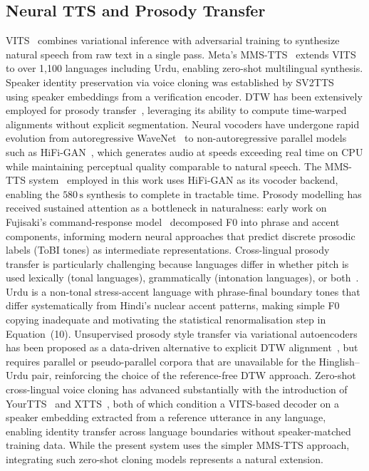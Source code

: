 \documentclass[10pt,twocolumn]{article}
\begin{document}
\subsection{Neural TTS and Prosody Transfer}
VITS~\cite{kim2021conditional} combines variational inference with adversarial training to synthesize natural speech from raw text in a single pass. Meta's MMS-TTS~\cite{pratap2023scaling} extends VITS to over 1,100 languages including Urdu, enabling zero-shot multilingual synthesis. Speaker identity preservation via voice cloning was established by SV2TTS~\cite{jia2018transfer} using speaker embeddings from a verification encoder. DTW has been extensively employed for prosody transfer~\cite{suni2013hierarchical}, leveraging its ability to compute time-warped alignments without explicit segmentation. Neural vocoders have undergone rapid evolution from
autoregressive WaveNet~\cite{oord2016wavenet} to non-autoregressive
parallel models such as HiFi-GAN~\cite{kong2020hifi}, which
generates audio at speeds exceeding real time on CPU while
maintaining perceptual quality comparable to natural speech.
The MMS-TTS system~\cite{pratap2023scaling} employed in this
work uses HiFi-GAN as its vocoder backend, enabling the
$580\,\text{s}$ synthesis to complete in tractable time.
Prosody modelling has received sustained attention as a
bottleneck in naturalness: early work on Fujisaki's command-response
model~\cite{fujisaki1984analysis} decomposed F0 into phrase and
accent components, informing modern neural approaches that
predict discrete prosodic labels (ToBI tones) as intermediate
representations. Cross-lingual prosody transfer is particularly
challenging because languages differ in whether pitch is used
lexically (tonal languages), grammatically (intonation languages),
or both~\cite{ladd2008intonational}. Urdu is a non-tonal
stress-accent language with phrase-final boundary tones that
differ systematically from Hindi's nuclear accent patterns,
making simple F0 copying inadequate and motivating the
statistical renormalisation step in Equation~(10). Unsupervised
prosody style transfer via variational autoencoders has been
proposed as a data-driven alternative to explicit DTW
alignment~\cite{skerry2018towards}, but requires parallel
or pseudo-parallel corpora that are unavailable for the
Hinglish--Urdu pair, reinforcing the choice of the
reference-free DTW approach.
Zero-shot cross-lingual voice cloning has advanced substantially
with the introduction of YourTTS~\cite{casanova2022yourtts} and
XTTS~\cite{casanova2024xtts}, both of which condition a VITS-based
decoder on a speaker embedding extracted from a reference utterance
in any language, enabling identity transfer across language
boundaries without speaker-matched training data. While the present
system uses the simpler MMS-TTS approach, integrating such
zero-shot cloning models represents a natural extension.
\end{document}
